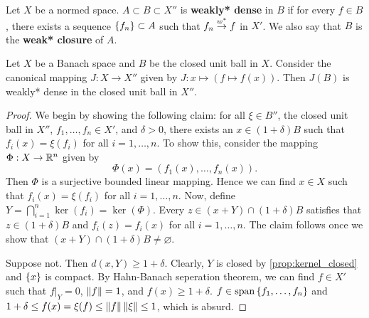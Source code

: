 \begin{definition}
    Let $X$ be a normed space. $A\subset B\subset X''$ is \textbf{weakly* dense} 
    in $B$ if for every $f\in B$, there exists a sequence $\left\{ {f_n} \right\}\subset A$ such that 
    $f_n\overset{w^*}{\to} f$ in $X'$. We also say that $B$ is the \textbf{weak* closure} of $A$.
\end{definition}

\begin{theorem}[Goldstine]
    Let $X$ be a Banach space and $B$ be the closed unit ball in $X$. 
    Consider the canonical mapping $J:X\to X''$ given by $J:x\mapsto 
    (f\mapsto f(x))$. Then $J(B)$ is weakly* dense in the closed unit 
    ball in $X''$.
\end{theorem}
\begin{proof}
    We begin by showing the following claim: for all $\xi\in B''$, the 
    closed unit ball in $X''$, $f_1,\ldots,f_n\in X'$, 
    and $\delta>0$, there exists an $x\in(1+\delta)B$ such that $f_i(x) = \xi(f_i)$ 
    for all $i=1,\ldots,n$. To show this, consider the mapping $\Phi:X\to\mathbb{R}^n$ given by 
    \begin{equation*}
        \Phi(x) = (f_1(x),\ldots,f_n(x)).
    \end{equation*}
    Then $\Phi$ is a surjective bounded linear mapping. Hence we can find 
    $x\in X$ such that $f_i(x) = \xi(f_i)$ for all $i=1,\ldots,n$. 
    Now, define $Y = \bigcap_{i=1}^n \ker(f_i) = \ker(\Phi)$. Every 
    $z\in (x+Y)\cap(1+\delta)B$ satisfies that $z\in(1+\delta)B$ and 
    $f_i(z) = f_i(x)$ for all $i=1,\ldots,n$. The claim follows once
    we show that $(x+Y)\cap(1+\delta)B\neq\varnothing$.
    
    Suppose not. Then $d(x,Y)\geq 1+\delta$. Clearly, $Y$ is closed by 
    \cref{prop:kernel_closed} and $\left\{ {x} \right\}$ is compact. By Hahn-Banach 
    seperation theorem, we can find $f\in X'$ such that $f|_Y = 0$, 
    $\left\lVert {f} \right\rVert = 1$, and $f(x) \geq 1+\delta$. $f\in\operatorname{span}\left\{ {f_1,\ldots,f_n} \right\}$ 
    and $1+\delta \leq f(x) = \xi(f) \leq \left\lVert {f} \right\rVert\left\lVert {\xi} \right\rVert \leq 1$, 
    which is absurd. 


\end{proof}
